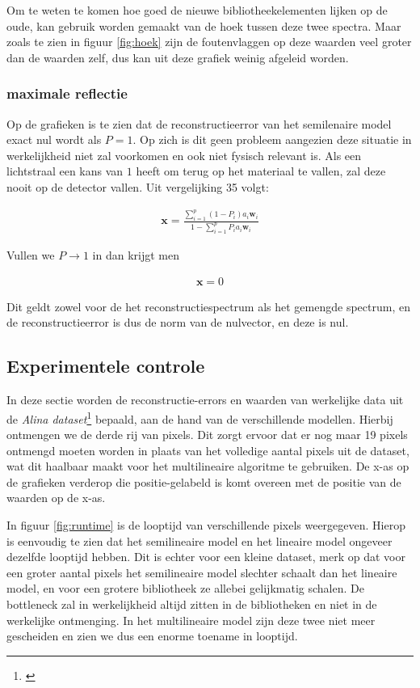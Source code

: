 \documentclass[12pt]{report}
\newcommand{\footcite}[1]{\cite{#1}\let\thefootnote\relax \footnote{\cite{#1} \bibentry{#1}} }
\begin{document}
Om te weten te komen hoe goed de nieuwe bibliotheekelementen lijken op de oude, kan gebruik worden gemaakt van de hoek tussen deze twee spectra. Maar  zoals te zien in figuur \ref{fig:hoek} zijn de foutenvlaggen op deze waarden veel groter dan de waarden zelf, dus kan uit deze grafiek weinig afgeleid worden.

\subsubsection{maximale reflectie}

Op de grafieken is te zien dat de reconstructieerror van het semilenaire model exact nul wordt als $P=1$. Op zich is dit geen probleem aangezien deze situatie in werkelijkheid niet zal voorkomen en ook niet fysisch relevant is. Als een lichtstraal een kans van $1$ heeft om terug op het materiaal te vallen, zal deze nooit op de detector vallen. Uit vergelijking 35 volgt:

\begin{align}
\bm{x} = \frac{\sum_{i=1}^p (1-P_i) a_{i} \bm{w}_{i}}{1-\sum_{i=1}^p P_i a_{i} \bm{w}_{i}}
\end{align}

Vullen we $P \rightarrow 1$ in dan krijgt men

\begin{align}
\bm{x} = 0
\end{align}

Dit geldt zowel voor de het reconstructiespectrum als het gemengde spectrum, en de reconstructieerror is dus de norm van de nulvector, en deze is nul.

\subsection{Experimentele controle} \label{sec:exp}

In deze sectie worden de reconstructie-errors en waarden van werkelijke data uit de \textit{Alina dataset}\footcite{alina} bepaald, aan de hand van de verschillende modellen. Hierbij ontmengen we de derde rij van pixels. Dit zorgt ervoor dat er nog maar 19 pixels ontmengd moeten worden in plaats van het volledige aantal pixels uit de dataset, wat dit haalbaar maakt voor het multilineaire algoritme te gebruiken. De x-as op de grafieken verderop die positie-gelabeld is komt overeen met de positie van de waarden op de x-as.

In figuur \ref{fig:runtime} is de looptijd van verschillende pixels weergegeven. Hierop is eenvoudig te zien dat het semilineaire model en het lineaire model ongeveer dezelfde looptijd hebben. Dit is echter voor een kleine dataset, merk op dat voor een groter aantal pixels het semilineaire model slechter schaalt dan het lineaire model, en voor een grotere bibliotheek ze allebei gelijkmatig schalen. De bottleneck zal in werkelijkheid altijd zitten in de bibliotheken en niet in de werkelijke ontmenging. In het multilineaire model zijn deze twee niet meer gescheiden en zien we dus een enorme toename in looptijd.
\end{document}
